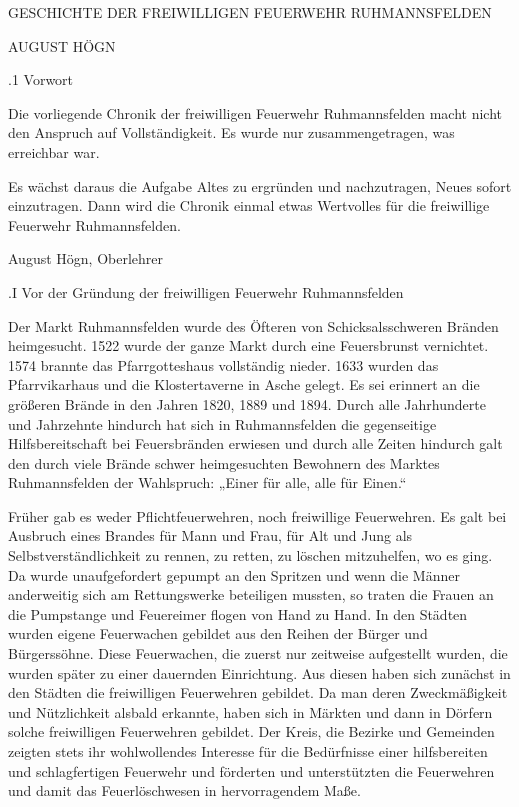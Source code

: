 \documentclass[12pt,a4pager]{book}
\begin{document}
GESCHICHTE DER FREIWILLIGEN FEUERWEHR RUHMANNSFELDEN



AUGUST HÖGN

.1 Vorwort

Die vorliegende Chronik der freiwilligen Feuerwehr Ruhmannsfelden macht nicht
den Anspruch auf Vollständigkeit. Es wurde nur zusammengetragen, was erreichbar
war.

Es wächst daraus die Aufgabe Altes zu ergründen und nachzutragen, Neues sofort
einzutragen. Dann wird die Chronik einmal etwas Wertvolles für die freiwillige
Feuerwehr Ruhmannsfelden.



August Högn, Oberlehrer

.I Vor der Gründung der freiwilligen Feuerwehr Ruhmannsfelden

Der Markt Ruhmannsfelden wurde des Öfteren von Schicksalsschweren Bränden
heimgesucht. 1522 wurde der ganze Markt durch eine Feuersbrunst vernichtet. 1574
brannte das Pfarrgotteshaus vollständig nieder. 1633 wurden das Pfarrvikarhaus
und die Klostertaverne in Asche gelegt. Es sei erinnert an die größeren Brände
in den Jahren 1820, 1889 und 1894. Durch alle Jahrhunderte und Jahrzehnte
hindurch hat sich in Ruhmannsfelden die gegenseitige Hilfsbereitschaft bei
Feuersbränden erwiesen und durch alle Zeiten hindurch galt den durch viele
Brände schwer heimgesuchten Bewohnern des Marktes Ruhmannsfelden der Wahlspruch:
„Einer für alle, alle für Einen.“

Früher gab es weder Pflichtfeuerwehren, noch freiwillige Feuerwehren. Es galt
bei Ausbruch eines Brandes für Mann und Frau, für Alt und Jung als
Selbstverständlichkeit zu rennen, zu retten, zu löschen mitzuhelfen, wo es ging.
Da wurde unaufgefordert gepumpt an den Spritzen und wenn die Männer anderweitig
sich am Rettungswerke beteiligen mussten, so traten die Frauen an die Pumpstange
und Feuereimer flogen von Hand zu Hand. In den Städten wurden eigene Feuerwachen
gebildet aus den Reihen der Bürger und Bürgerssöhne. Diese Feuerwachen, die
zuerst nur zeitweise aufgestellt wurden, die wurden später zu einer dauernden
Einrichtung. Aus diesen haben sich zunächst in den Städten die freiwilligen
Feuerwehren gebildet. Da man deren Zweckmäßigkeit und Nützlichkeit alsbald
erkannte, haben sich in Märkten und dann in Dörfern solche freiwilligen
Feuerwehren gebildet. Der Kreis, die Bezirke und Gemeinden zeigten stets ihr
wohlwollendes Interesse für die Bedürfnisse einer hilfsbereiten und
schlagfertigen Feuerwehr und förderten und unterstützten die Feuerwehren und
damit das Feuerlöschwesen in hervorragendem Maße.
\end{document}
